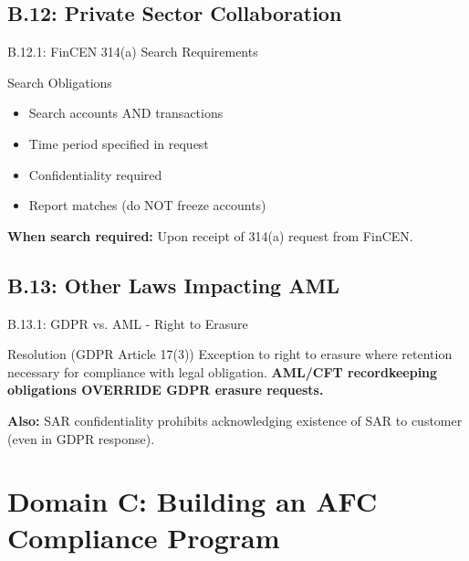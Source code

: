 \documentclass{beamer}
\begin{document}
	\subsection{B.12: Private Sector Collaboration}
	
	\begin{frame}{B.12.1: FinCEN 314(a) Search Requirements}
		\begin{block}{Search Obligations}
			\begin{itemize}
				\item Search accounts AND transactions
				\item Time period specified in request
				\item Confidentiality required
				\item Report matches (do NOT freeze accounts)
			\end{itemize}
		\end{block}
		\textbf{When search required:} Upon receipt of 314(a) request from FinCEN.
	\end{frame}
	
	\subsection{B.13: Other Laws Impacting AML}
	
	\begin{frame}{B.13.1: GDPR vs. AML - Right to Erasure}
		\begin{block}{Resolution (GDPR Article 17(3))}
			Exception to right to erasure where retention necessary for compliance with legal obligation.
			\vspace{0.2cm}
			\textbf{AML/CFT recordkeeping obligations OVERRIDE GDPR erasure requests.}
		\end{block}
		\textbf{Also:} SAR confidentiality prohibits acknowledging existence of SAR to customer (even in GDPR response).
	\end{frame}
	
	
	\section{Domain C: Building an AFC Compliance Program}
	
\end{document}
